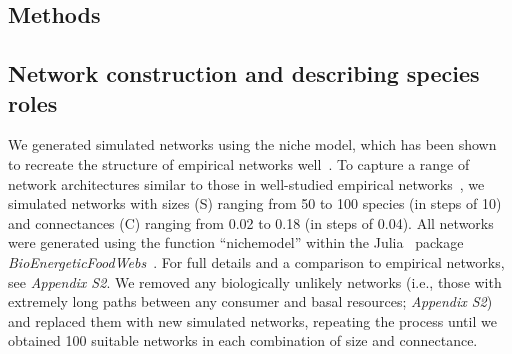 \documentclass[12pt]{article}
\begin{document}
\begin{spacing}{2.0}

    



\section*{Methods}

    \subsection*{Network construction and describing species roles}

        We generated simulated networks using the niche model, which has been shown to recreate the structure of empirical networks well~\citep{Williams2000,Stouffer2007}.
        To capture a range of network architectures similar to those in well-studied empirical networks~\citep{Dunne2002,Dunne2002e}, we simulated networks with sizes (S) ranging from 50 to 100 species (in steps of 10) and connectances (C) ranging from 0.02 to 0.18 (in steps of 0.04). 
        All networks were generated using the function ``nichemodel'' within the Julia~\citep{Bezanson2017julia} package \emph{BioEnergeticFoodWebs}~\citep{bioenergfw,Delmas2017}.   
        For full details and a comparison to empirical networks, see \emph{Appendix S2}.
        We removed any biologically unlikely networks (i.e., those with extremely long paths between any consumer and basal resources; \emph{Appendix S2}) and replaced them with new simulated networks, repeating the process until we obtained 100 suitable networks in each combination of size and connectance.


\end{spacing}
\end{document}
